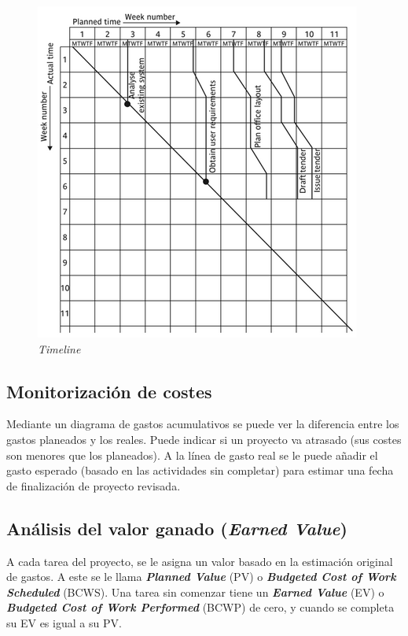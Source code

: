\documentclass[12pt]{article}
\begin{document}
\begin{figure} [ht]
    \centering
    \includegraphics[keepaspectratio=true, scale=0.75]{images/timeline_chart.png}
    \caption{\textit{Timeline}}
    \label{fig:9.3}
\end{figure}

\subsection{Monitorización de costes}
\label{9.5.0}

{Mediante un diagrama de gastos acumulativos se puede ver la diferencia entre los gastos planeados y los reales. Puede indicar si un proyecto va atrasado (sus costes son menores que los planeados). A la línea de gasto real se le puede añadir el gasto esperado (basado en las actividades sin completar) para estimar una fecha de finalización de proyecto revisada.}

\subsection{Análisis del valor ganado (\textit{Earned Value})}
\label{9.6.0}

{A cada tarea del proyecto, se le asigna un valor basado en la estimación original de gastos. A este se le llama \textbf{\textit{Planned Value}} (PV) o \textbf{\textit{Budgeted Cost of Work Scheduled}} (BCWS). Una tarea sin comenzar tiene un \textbf{\textit{Earned Value}} (EV) o \textbf{\textit{Budgeted Cost of Work Performed}} (BCWP) de cero, y cuando se completa su EV es igual a su PV.} \bigskip
\end{document}

